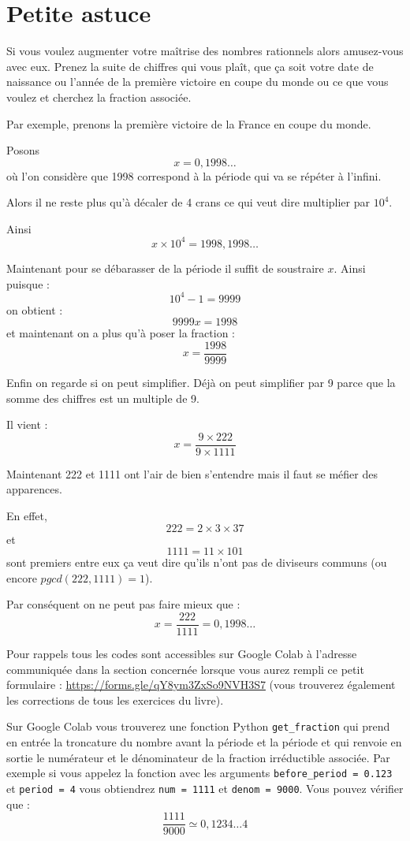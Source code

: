 \documentclass[a4paper,11pt]{book}
\begin{document}
\clearpage

\section{Petite astuce}
\label{sec:org29f80a1}
\label{org36b98de}
\label{page:sec2.6.3tip}


Si vous voulez augmenter votre maîtrise des nombres rationnels
alors amusez-vous avec eux. Prenez la suite de chiffres qui vous
plaît, que ça soit votre date de naissance ou l'année de la
première victoire en coupe du monde ou ce que vous voulez et
cherchez la fraction associée.

Par exemple, prenons la première victoire de la France en coupe du
monde.

Posons \[x = 0,1998\dots\] où l'on considère que 1998 correspond à la
période qui va se répéter à l'infini.

Alors il ne reste plus qu'à décaler de 4 crans ce qui veut dire
multiplier par \(10^4\).

Ainsi \[x\times 10^4 = 1998,1998\dots\]

Maintenant pour se débarasser de la période il suffit de soustraire
\(x\). Ainsi puisque :
\[10^4 - 1 = 9999\]
on obtient :
\[9999x = 1998\]
et maintenant on a plus qu'à poser la fraction :
\[x = \dfrac{1998}{9999}\]

Enfin on regarde si on peut simplifier. Déjà on peut simplifier par 9
parce que la somme des chiffres est un multiple de 9.

Il vient :
\[x = \dfrac{9\times 222}{9\times 1111}\]

Maintenant 222 et 1111 ont l'air de bien s'entendre mais il faut se
méfier des apparences.

En effet, \[222 = 2\times 3\times 37\] et \[1111 = 11\times 101\] sont
premiers entre eux ça veut dire qu'ils n'ont pas de diviseurs communs
(ou encore \(pgcd(222, 1111) = 1\)).


Par conséquent on ne peut pas faire mieux que :
\[x = \dfrac{222}{1111} = 0,1998\dots\]

Pour rappels tous les codes sont accessibles sur Google Colab à
l'adresse communiquée dans la section concernée lorsque vous
aurez rempli ce petit formulaire : \url{https://forms.gle/qY8ym3ZxSo9NVH3S7}
(vous trouverez également les corrections de tous les exercices du livre).

Sur Google Colab vous trouverez une fonction Python \texttt{get\_fraction}
qui prend en entrée la troncature du nombre avant la période et la
période et qui renvoie en sortie le numérateur et le dénominateur
de la fraction irréductible associée. Par exemple si vous appelez
la fonction avec les arguments \texttt{before\_period = 0.123} et \texttt{period =
4} vous obtiendrez \texttt{num = 1111} et \texttt{denom = 9000}.
Vous pouvez vérifier que :
\[\dfrac{1111}{9000} \simeq 0,1234\dots4\]
\end{document}
